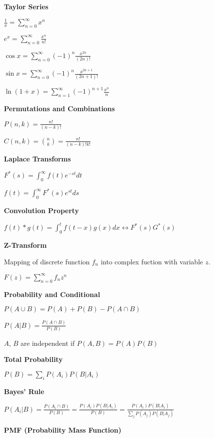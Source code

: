 \documentclass{scrartcl}
\begin{document}
\raggedright
\begin{multicols*}{3}



{\bf Taylor Series}

$\frac{1}{x} = \sum_{n=0}^{\infty}x^n$

$e^x = \sum_{n=0}^{\infty}\frac{x^n}{n!}$

$\cos x = \sum_{n=0}^{\infty}(-1)^n\frac{x^{2n}}{(2n)!}$

$\sin x = \sum_{n=0}^{\infty}(-1)^n\frac{x^{2n+1}}{(2n+1)!}$

$\ln(1+x) = \sum_{n=1}^{\infty}(-1)^{n+1}\frac{x^n}{n}$



{\bf Permutations and Combinations}

$P(n,k)=\frac{n!}{(n-k)!}$

$C(n,k) = {n\choose k} = \frac{n!}{(n-k)!k!}$



{\bf Laplace Transforms}

$F^*(s)=\int_0^\infty f(t)e^{-st}dt$

$f(t) = \int_0^\infty F^*(s)e^{st}ds$



{\bf Convolution Property}

$f(t)*g(t)=\int_0^t f(t-x)g(x)dx \leftrightarrow F^*(s)G^*(s)$



{\bf Z-Transform}

Mapping of discrete function $f_n$ into complex fuction with variable $z$.

$F(z)=\sum_{n=0}^{\infty}f_nz^n$



{\bf Probability and Conditional}

$P(A\cup B) = P(A) + P(B) - P(A\cap B)$

$P(A|B) = \frac{P(A\cap B)}{P(B)}$

$A$, $B$ are independent if $P(A,B)=P(A)P(B)$



{\bf Total Probability}

$P(B) = \sum_{i} P(A_i)P(B|A_i)$



{\bf Bayes' Rule}

$P(A_i|B) = \frac{P(A_i\cap B)}{P(B)} = \frac{P(A_i)P(B|A_i)}{P(B)} = \frac{P(A_i)P(B|A_i)}{\sum_jP(A_j)P(B|A_j)}$



{\bf PMF (Probability Mass Function)}


\end{multicols*}
\end{document}
